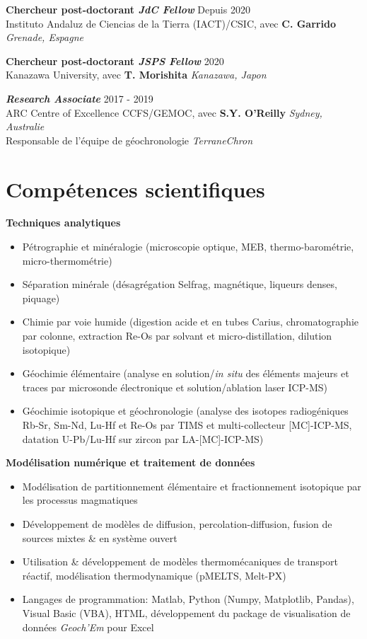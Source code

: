 \documentclass[a4paper,11pt]{article}
\begin{document}
    \textbf{Chercheur post-doctorant \textit{JdC Fellow}}
    \hfill {Depuis 2020}\\
    Instituto Andaluz de Ciencias de la Tierra (IACT)/CSIC, avec \textbf{C. Garrido}
    \hfill \textit{Grenade, Espagne}
     
    \textbf{Chercheur post-doctorant \textit{JSPS Fellow}}
    \hfill {2020}\\
    Kanazawa University, avec \textbf{T. Morishita}
    \hfill \textit{Kanazawa, Japon}
    
    \textbf{\textit{Research Associate}}
    \hfill {2017 - 2019}\\
    ARC Centre of Excellence CCFS/GEMOC, avec \textbf{S.Y. O'Reilly}
    \hfill \textit{Sydney, Australie}\\
    Responsable de l’équipe de géochronologie \textit{TerraneChron}
    
\section{Compétences scientifiques}

    \textbf{Techniques analytiques} 
    \begin{itemize}[itemsep=0pt,parsep=2pt]
        \item Pétrographie et minéralogie (microscopie optique, MEB, thermo-barométrie, micro-thermométrie)
        \item Séparation minérale (désagrégation Selfrag, magnétique, liqueurs denses, piquage)
        \item Chimie par voie humide (digestion acide et en tubes Carius, chromatographie par colonne, extraction Re-Os par solvant et micro-distillation, dilution isotopique)
        \item Géochimie élémentaire (analyse en solution/\textit{in situ} des éléments majeurs et traces par microsonde électronique et solution/ablation laser ICP-MS)
        \item Géochimie isotopique et géochronologie (analyse des isotopes radiogéniques Rb-Sr, Sm-Nd, Lu-Hf et Re-Os par TIMS et multi-collecteur [MC]-ICP-MS, datation U-Pb/Lu-Hf sur zircon par LA-[MC]-ICP-MS)
    \end{itemize}
    
    \textbf{Modélisation numérique et traitement de données}
    \begin{itemize}[itemsep=0pt,parsep=2pt]
        \item Modélisation de partitionnement élémentaire et fractionnement isotopique par les processus magmatiques
        \item Développement de modèles de diffusion, percolation-diffusion, fusion de sources mixtes \& en système ouvert
        \item Utilisation \& développement de modèles thermomécaniques de transport réactif, modélisation thermodynamique (pMELTS, Melt-PX)
        \item Langages de programmation: Matlab, Python (Numpy, Matplotlib, Pandas), Visual Basic (VBA), HTML, développement du package de visualisation de données \textit{Geoch’Em} pour Excel
    \end{itemize}
    
\end{document}
